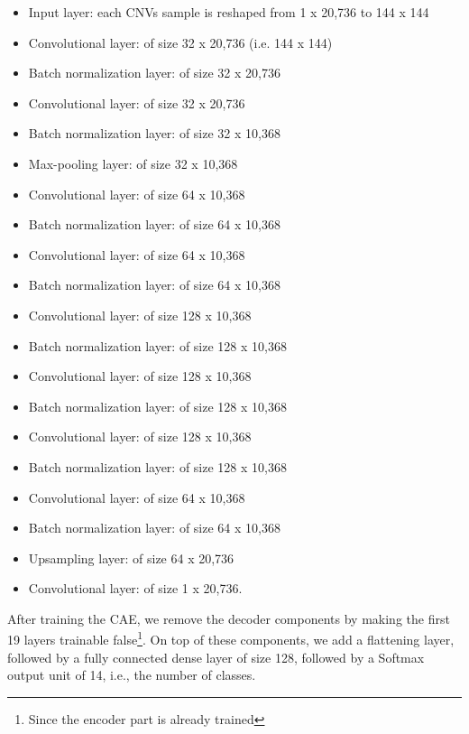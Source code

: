 \begin{itemize}[noitemsep]
    \scriptsize
        \item Input layer: each CNVs sample is reshaped from 1 x 20,736 to 144 x 144
        \item Convolutional layer: of size 32 x 20,736 (i.e. 144 x 144) 
        \item Batch normalization layer: of size 32 x 20,736
        \item Convolutional layer: of size 32 x 20,736
        \item Batch normalization layer: of size 32 x 10,368
        \item Max-pooling layer: of size 32 x 10,368
        \item Convolutional layer: of size 64 x 10,368
        \item Batch normalization layer: of size 64 x 10,368
        \item Convolutional layer: of size 64 x 10,368
        \item Batch normalization layer: of size 64 x 10,368
        \item Convolutional layer: of size 128 x 10,368
        \item Batch normalization layer: of size 128 x 10,368
        \item Convolutional layer: of size 128 x 10,368
        \item Batch normalization layer: of size 128 x 10,368
        \item Convolutional layer: of size 128 x 10,368
        \item Batch normalization layer: of size 128 x 10,368
        \item Convolutional layer: of size 64 x 10,368
        \item Batch normalization layer: of size 64 x 10,368
        \item Upsampling layer: of size 64 x 20,736 
        \item Convolutional layer: of size 1 x 20,736.
\end{itemize}

\hspace*{3.5mm} After training the CAE, we remove the decoder components by making the first 19 layers trainable false\footnote{Since the encoder part is already trained}. On top of these components, we add a flattening layer, followed by a fully connected dense layer of size 128, followed by a Softmax output unit of 14, i.e., the number of classes. 

